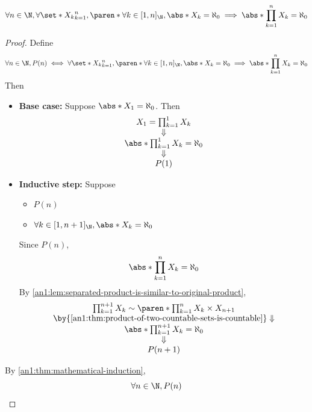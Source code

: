 \begin{theorem} \label{an1:thm:product-of-finite-countable-sets-is-countable}
  \[
    \forall n \in \N, \forall \set*{X_{k}}_{k = 1}^{n},
    \paren*{\forall k \in [1, n]_{\N}, \abs*{X_{k}} = \aleph_{0}}
    \implies \abs*{\prod_{k = 1}^{n} X_{k}} = \aleph_{0}
  \]
\end{theorem}

\begin{proof}
  Define
  \[
    \forall n \in \N, P(n) \iff \forall \set*{X_{k}}_{k = 1}^{n}, \paren*{\forall k \in [1, n]_{\N},
      \abs*{X_{k}} = \aleph_{0}} \implies \abs*{\prod_{k = 1}^{n} X_{k}} = \aleph_{0}
  \]
  Then
  \begin{itemize}
    \item \textbf{Base case:} Suppose $\abs*{X_{1}} = \aleph_{0}$. Then
          \[
            \begin{array}{c}
              X_{1} = \prod_{k = 1}^{1} X_{k}             \\
              \Downarrow                                  \\
              \abs*{\prod_{k = 1}^{1} X_{k}} = \aleph_{0} \\
              \Downarrow                                  \\
              P(1)
            \end{array}
          \]
    \item \textbf{Inductive step:} Suppose
          \begin{itemize}
            \item $P(n)$
            \item $\forall k \in [1, n + 1]_{\N}, \abs*{X_{k}} = \aleph_{0}$
          \end{itemize}
          Since $P(n)$,
          \[
            \abs*{\prod_{k = 1}^{n} X_{k}} = \aleph_{0}
          \]
          By \cref{an1:lem:separated-product-is-similar-to-original-product},
          \[
            \begin{array}{c}
              \prod_{k = 1}^{n + 1} X_{k} \sim \paren*{\prod_{k = 1}^{n} X_{k}} \times X_{n + 1} \\
              \by{\Cref{an1:thm:product-of-two-countable-sets-is-countable}} \Downarrow          \\
              \abs*{\prod_{k = 1}^{n + 1} X_{k}} = \aleph_{0}                                    \\
              \Downarrow                                                                         \\
              P(n + 1)
            \end{array}
          \]
  \end{itemize}
  By \cref{an1:thm:mathematical-induction},
  \[
    \forall n \in \N, P(n)
  \]
\end{proof}

